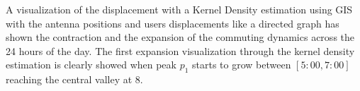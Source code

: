 A visualization of the displacement with a Kernel Density estimation using GIS with the antenna positions and users displacements like a directed graph has shown the contraction and the expansion of the commuting dynamics across the 24 hours of the day. The first expansion visualization through the kernel density estimation is clearly showed when peak $p_1$ starts to grow between $[5:00,7:00]$ reaching the central valley at $8$.

\newpage

\begin{figure}
\centering
{}
\end{figure}
